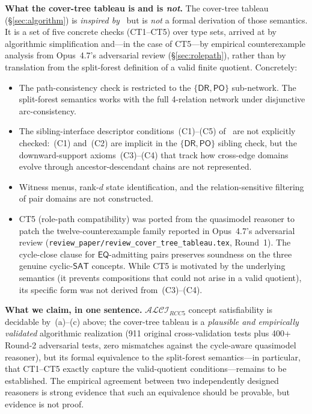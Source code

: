 \documentclass[a4paper,11pt]{article}
\theoremstyle{definition}
\newcommand{\ALCIRCC}[1]{\ensuremath{\mathcal{ALCI}_{\mathit{RCC#1}}}}
\newcommand{\DR}{\ensuremath{\mathsf{DR}}}
\newcommand{\PO}{\ensuremath{\mathsf{PO}}}
\newcommand{\EQ}{\ensuremath{\mathsf{EQ}}}
\begin{document}
\medskip\noindent\textbf{What the cover-tree tableau is and is
\emph{not}.}
The cover-tree tableau (\S\ref{sec:algorithm}) is \emph{inspired
by}~\cite{SiblingCompleted,CoverTree} but is \emph{not} a formal
derivation of those semantics.  It is a set of five concrete
checks (CT1--CT5) over type sets, arrived at by algorithmic
simplification and---in the case of CT5---by empirical
counterexample analysis from Opus~4.7's adversarial review
(\S\ref{sec:rolepath}), rather than by translation from the
split-forest definition of a valid finite quotient.  Concretely:
\begin{itemize}[nosep]
  \item The path-consistency check is restricted to the $\{\DR,\PO\}$
    sub-network.  The split-forest semantics works with the full
    4-relation network under disjunctive arc-consistency.
  \item The sibling-interface descriptor conditions~(C1)--(C5)
    of~\cite{SiblingCompleted} are not explicitly checked:~(C1)
    and~(C2) are implicit in the $\{\DR,\PO\}$ sibling check, but
    the downward-support axioms~(C3)--(C4) that track how
    cross-edge domains evolve through ancestor-descendant chains
    are not represented.
  \item Witness menus, rank-$d$ state identification, and the
    relation-sensitive filtering of pair domains are not
    constructed.
  \item CT5 (role-path compatibility) was ported from the
    quasimodel reasoner to patch the twelve-counterexample family
    reported in Opus~4.7's adversarial review
    (\texttt{review\_paper/review\_cover\_tree\_tableau.tex},
    Round~1).  The cycle-close clause for $\EQ$-admitting pairs
    preserves soundness on the three genuine cyclic-$\mathsf{SAT}$
    concepts.  While CT5 is motivated by the underlying semantics
    (it prevents compositions that could not arise in a valid
    quotient), its specific form was not derived from~(C3)--(C4).
\end{itemize}

\medskip\noindent\textbf{What we claim, in one sentence.}
$\ALCIRCC{5}$ concept satisfiability is decidable by~(a)--(c) above;
the cover-tree tableau is a \emph{plausible and empirically
validated} algorithmic realization (911 original cross-validation
tests plus 400+ Round-2 adversarial tests, zero mismatches against
the cycle-aware quasimodel reasoner), but its formal equivalence
to the split-forest semantics---in particular, that CT1--CT5
exactly capture the valid-quotient conditions---remains to be
established.  The empirical agreement between two independently
designed reasoners is strong evidence that such an equivalence
should be provable, but evidence is not proof.
\end{document}
